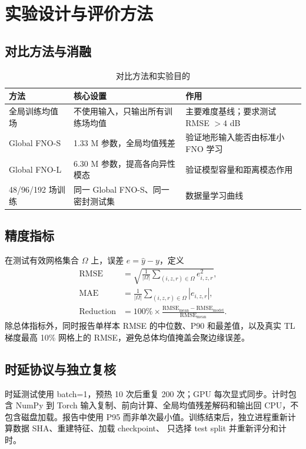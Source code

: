 \documentclass[UTF8,11pt]{ctexart}
\newcommand{\RMSE}{\mathrm{RMSE}}
\begin{document}
\section{实验设计与评价方法}

\subsection{对比方法与消融}

\begin{table}[H]
\centering
\caption{对比方法和实验目的}
\begin{tabularx}{\textwidth}{L{3.3cm}L{3.6cm}Y}
\toprule
方法 & 核心设置 & 作用 \\
\midrule
全局训练均值场 & 不使用输入，只输出所有训练场均值 & 主要难度基线；要求测试 RMSE $>4$ dB \\
Global FNO-S & 1.33 M 参数，全局均值残差 & 验证地形输入能否由标准小 FNO 学习 \\
Global FNO-L & 6.30 M 参数，提高各向异性模态 & 验证模型容量和距离模态作用 \\
48/96/192 场训练 & 同一 Global FNO-S、同一密封测试集 & 数据量学习曲线 \\
\bottomrule
\end{tabularx}
\end{table}

\subsection{精度指标}

在测试有效网格集合 $\Omega$ 上，误差 $e=\hat y-y$，定义
\begin{align}
  \RMSE &= \sqrt{\frac{1}{|\Omega|}\sum_{(i,z,r)\in\Omega}e_{i,z,r}^2},\\
  \mathrm{MAE} &= \frac{1}{|\Omega|}\sum_{(i,z,r)\in\Omega}|e_{i,z,r}|,\\
  \mathrm{Reduction} &=100\%\times\frac{\RMSE_{\mathrm{mean}}-\RMSE_{\mathrm{model}}}
  {\RMSE_{\mathrm{mean}}}.
\end{align}
除总体指标外，同时报告单样本 RMSE 的中位数、P90 和最差值，以及真实 TL 梯度最高
10\% 网格上的 RMSE，避免总体均值掩盖会聚边缘误差。

\subsection{时延协议与独立复核}

时延测试使用 batch=1，预热 10 次后重复 200 次；GPU 每次显式同步。计时包含 NumPy 到
Torch 输入复制、前向计算、全局均值残差解码和输出回 CPU，不包含磁盘加载。报告中使用 P95
而非单次最小值。训练结束后，独立进程重新计算数据 SHA、重建特征、加载 checkpoint、
只选择 test split 并重新评分和计时。
\end{document}
